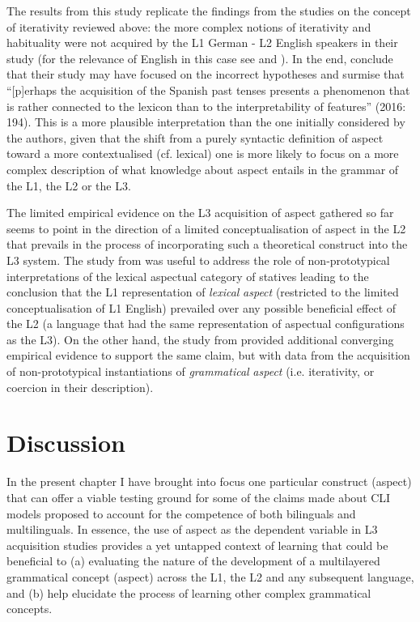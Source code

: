 \documentclass[output=paper,modfonts,nonflat,newtxmath]{langsci/langscibook}
\begin{document}
The results from this study replicate the findings from the studies on the concept of iterativity reviewed above: the more complex notions of iterativity and habituality were not acquired by the L1 German - L2 English speakers in their study (for the relevance of English in this case see \citealt{AthanasopoulosBylund2013} and \citealt{AthanasopoulosEtAl2015}). In the end, \citeauthor{DiaubalickGuijarro-Fuentes2016} conclude that their study may have focused on the incorrect hypotheses and surmise that “[p]erhaps the acquisition of the Spanish past tenses presents a phenomenon that is rather connected to the lexicon than to the interpretability of features” (2016: 194). This is a more plausible interpretation than the one initially considered by the authors, given that the shift from a purely syntactic definition of aspect toward a more contextualised (cf. lexical) one is more likely to focus on a more complex description of what knowledge about aspect entails in the grammar of the L1, the L2 or the L3.

The limited empirical evidence on the L3 acquisition of aspect gathered so far seems to point in the direction of a limited conceptualisation of aspect in the L2 that prevails in the process of incorporating such a theoretical construct into the L3 system. The study from \citet{Salaberry2005} was useful to address the role of non-prototypical interpretations of the lexical aspectual category of statives leading to the conclusion that the L1 representation of \textit{lexical} \textit{aspect} (restricted to the limited conceptualisation of L1 English) prevailed over any possible beneficial effect of the L2 (a language that had the same representation of aspectual configurations as the L3). On the other hand, the study from \citet{DiaubalickGuijarro-Fuentes2016} provided additional converging empirical evidence to support the same claim, but with data from the acquisition of non-prototypical instantiations of \textit{grammatical} \textit{aspect} (i.e. iterativity, or coercion in their description).

\section{{Discussion}}%
\label{sec:salaberry:4}

In the present chapter I have brought into focus one particular construct (aspect) that can offer a viable testing ground for some of the claims made about CLI models proposed to account for the competence of both bilinguals and multilinguals. In essence, the use of aspect as the dependent variable in L3 acquisition studies provides a yet untapped context of learning that could be beneficial to (a) evaluating the nature of the development of a multilayered grammatical concept (aspect) across the L1, the L2 and any subsequent language, and (b) help elucidate the process of learning other complex grammatical concepts.
\end{document}
